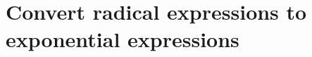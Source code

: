 \section*{Convert radical expressions to exponential expressions}

\begin{myConcept}{}
\end{myConcept}